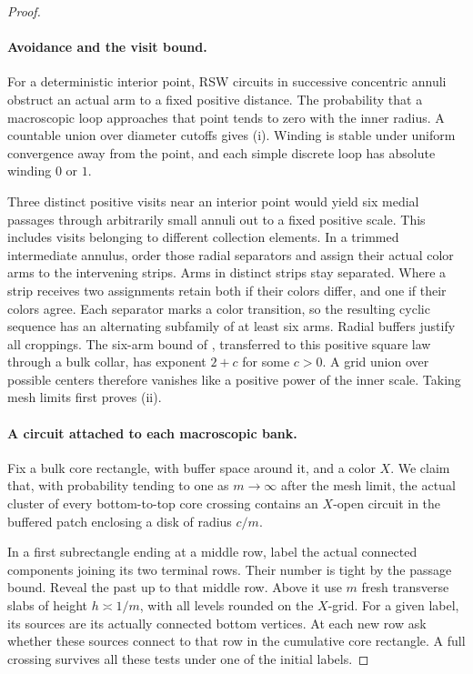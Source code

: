 \begin{proof}
\paragraph{Avoidance and the visit bound.}
For a deterministic interior point, RSW circuits in successive
concentric annuli obstruct an actual arm to a fixed positive distance.
The probability that a macroscopic loop approaches that point tends
to zero with the inner radius.  A countable union over diameter
cutoffs gives (i).  Winding is stable under uniform convergence away
from the point, and each simple discrete loop has absolute winding
$0$ or $1$.

Three distinct positive visits near an interior point would yield six
medial passages through arbitrarily small annuli out to a fixed
positive scale.  This includes visits belonging to different collection
elements.  In a trimmed intermediate annulus, order those radial
separators and assign their actual color arms to the intervening
strips.  Arms in distinct strips stay separated.  Where a strip
receives two assignments retain both if their colors differ, and one
if their colors agree.  Each separator marks a color transition, so
the resulting cyclic sequence has an alternating subfamily of at
least six arms.  Radial buffers justify all croppings.  The six-arm
bound of \citet[Corollary~6.7]{DMT2021Fractal}, transferred to this
positive square law through a bulk collar, has exponent $2+c$ for
some $c>0$.  A grid union over possible centers therefore vanishes
like a positive power of the inner scale.  Taking mesh limits first
proves (ii).

\paragraph{A circuit attached to each macroscopic bank.}
Fix a bulk core rectangle, with buffer space around it, and a color
$X$.  We claim that, with probability tending to one as $m\to\infty$
after the mesh limit, the actual cluster of every bottom-to-top core
crossing contains an $X$-open circuit in the buffered patch enclosing
a disk of radius $c/m$.

In a first subrectangle ending at a middle row, label the actual
connected components joining its two terminal rows.  Their number is
tight by the passage bound.  Reveal the past up to that middle row.
Above it use $m$ fresh transverse slabs of height $h\asymp1/m$,
with all levels rounded on the $X$-grid.  For a given label, its
sources are its actually connected bottom vertices.  At each new row
ask whether these sources connect to that row in the cumulative core
rectangle.  A full crossing survives all these tests under one of
the initial labels.


\end{proof}
